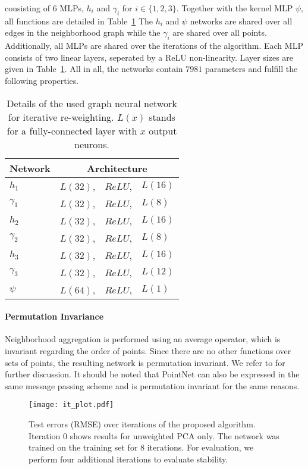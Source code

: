 \documentclass[10pt,twocolumn,letterpaper]{article}
\begin{document}
consisting of 6 MLPs, $h_i$ and $\gamma_i$ for $i \in \{1,2,3\}$. Together with the kernel MLP $\psi$, all functions are detailed in Table~\ref{tab:architecture_details}
The $h_i$ and $\psi$ networks are shared over all edges in the neighborhood graph while the $\gamma_i$ are shared over all points. Additionally, all MLPs are  shared over the iterations of the algorithm. Each MLP consists of two linear layers, seperated by a ReLU non-linearity. Layer sizes are given in \mbox{Table \ref{tab:architecture_details}}. All in all, the networks contain $7981$ parameters and fulfill the following properties.
\begin{table}[h]
  \centering
\begin{tabular}{l|rcl}
      \toprule
                                     Network     &   \multicolumn{3}{c}{Architecture} \\ \midrule
$h_1$   &  $ L(32)$, & $ReLU $, &  $L(16) $ \\ 
$\gamma_1$   &  $L(32)$, & $ReLU $, &  $ L(8) $ \\ 
$h_2$ &  $ L(32)$, &  $ ReLU $, &  $ L(16)$  \\ 
$\gamma_2$   &  $ L(32) $, &  $ ReLU $, &  $ L(8) $ \\ 
$h_3$   & $ L(32) $, &  $ ReLU $, &  $ L(16)$   \\
$\gamma_3$   & $ L(32) $, &  $ ReLU $, &  $ L(12) $  \\ 
$\psi$   & $ L(64) $, &  $ ReLU $, &  $ L(1) $  \\
\bottomrule
\end{tabular}
\caption{Details of the used graph neural network for iterative re-weighting. $L(x)$ stands for a fully-connected layer with $x$ output neurons.} \label{tab:architecture_details}
\end{table}


\paragraph{Permutation Invariance}
Neighborhood aggregation is performed using an average operator, which is invariant regarding the order of points. Since there are no other functions over sets of points, the resulting network is permutation invariant. We refer to \cite{Qi:2017} for further discussion. It should be noted that PointNet can also be expressed in the same message passing scheme and is permutation invariant for the same reasons.

\begin{figure*}[t]
\centering
  \texttt{[image: it\_plot.pdf]}
  \caption{Test errors (RMSE) over iterations of the proposed algorithm. Iteration $0$ shows results for unweighted PCA only. The network was trained on the training set for 8 iterations. For evaluation, we perform four additional iterations to evaluate stability.}
  \label{fig:iterations}
\end{figure*}
\end{document}
